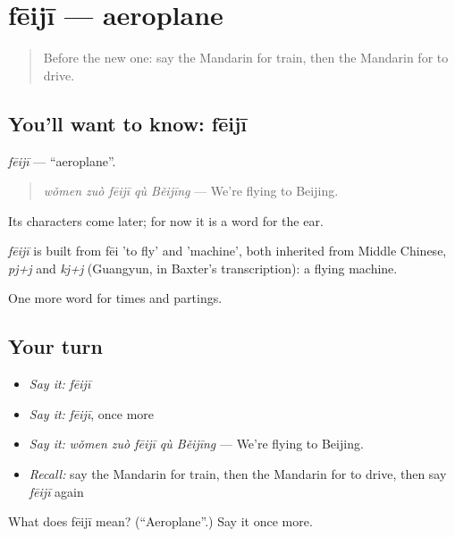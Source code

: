 \section[fēijī]{fēijī — aeroplane}

\label{lesson:ZH-C72-feiji}



\begin{quote}
Before the new one: say the Mandarin for train, then the Mandarin for to drive.
\end{quote}

\subsection*{You'll want to know: fēijī}
\emph{fēijī} — \textquotedblleft{}aeroplane\textquotedblright{}.

\begin{quote}
\emph{wǒmen zuò fēijī qù Běijīng} — We're flying to Beijing.
\end{quote}

Its characters come later; for now it is a word for the ear.

\begin{cousinweb}
\emph{fēijī} is built from fēi 'to fly' and  'machine', both inherited from Middle Chinese, \emph{pj+j} and \emph{kj+j} (Guangyun, in Baxter's transcription): a flying machine.
\end{cousinweb}

\begin{grammarlens}[title={What you've built}]
One more word for times and partings.
\end{grammarlens}

\subsection*{Your turn}
\begin{itemize}
\raggedright
  \item \emph{Say it:} \emph{fēijī}
  \item \emph{Say it:} \emph{fēijī}, once more
  \item \emph{Say it:} \emph{wǒmen zuò fēijī qù Běijīng} — We're flying to Beijing.
  \item \emph{Recall:} say the Mandarin for train, then the Mandarin for to drive, then say \emph{fēijī} again
\end{itemize}

\begin{tcolorbox}[breakable,colback=teal!4,colframe=teal!35!black,title={Before you move on}]
What does fēijī mean? (\textquotedblleft{}Aeroplane\textquotedblright{}.) Say it once more.
\end{tcolorbox}
